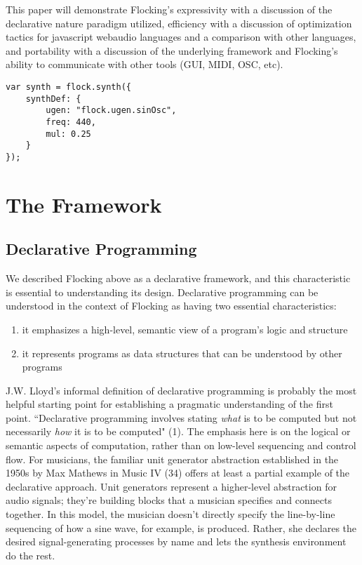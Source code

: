 \documentclass{article}
\begin{document}
This paper will demonstrate Flocking's expressivity with a discussion of the declarative nature paradigm utilized, efficiency with a discussion of optimization tactics for javascript webaudio languages and a comparison with other languages, and portability with a discussion of the underlying framework and Flocking's ability to communicate with other tools (GUI, MIDI, OSC, etc).


\begin{verbatim}
var synth = flock.synth({
    synthDef: {
        ugen: "flock.ugen.sinOsc",
        freq: 440,
        mul: 0.25
    }
});

\end{verbatim}


\section{The Framework}

\subsection{Declarative Programming}
We described Flocking above as a declarative framework, and this characteristic is essential to understanding its design. Declarative programming can be understood in the context of Flocking as having two essential characteristics:

\begin{enumerate}
\item it emphasizes a high-level, semantic view of a program’s logic and structure
\item it represents programs as data structures that can be understood by other programs
\end{enumerate}

J.W. Lloyd's informal definition of declarative programming is probably the most helpful starting point for establishing a pragmatic understanding of the first point. ``Declarative programming involves stating {\it what} is to be computed but not necessarily {\it how} it is to be computed" (1). The emphasis here is on the logical or semantic aspects of computation, rather than on low-level sequencing and control flow. For musicians, the familiar unit generator abstraction established in the 1950s by Max Mathews in Music IV (34) offers at least a partial example of the declarative approach. Unit generators represent a higher-level abstraction for audio signals; they're building blocks that a musician specifies and connects together. In this model, the musician doesn't directly specify the line-by-line sequencing of how a sine wave, for example, is produced. Rather, she declares the desired signal-generating processes by name and lets the synthesis environment do the rest.
\end{document}
